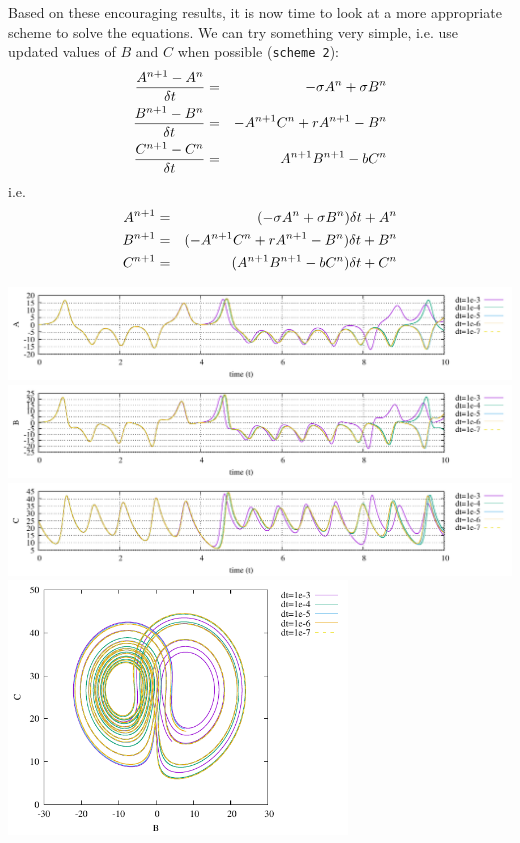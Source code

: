 Based on these encouraging results, it is now time to look at a more appropriate
scheme to solve the equations.
We can try something very simple, i.e. use updated values of $B$ and $C$ when possible ({\tt scheme 2}):
\begin{eqnarray}
\frac{A^{n+1}-A^n}{\delta t} &=& -\sigma A^n + \sigma B^n \nonumber\\
\frac{B^{n+1}-B^n}{\delta t} &=& -A^{n+1} C^n + rA^{n+1} -B^n  \nonumber\\
\frac{C^{n+1}-C^n}{\delta t} &=& A^{n+1} B^{n+1} - bC^n \nonumber
\end{eqnarray}
i.e.
\begin{eqnarray}
A^{n+1} &=& (-\sigma A^n + \sigma B^n) \delta t + A^n \nonumber\\
B^{n+1} &=& (-A^{n+1} C^n + rA^{n+1} -B^n ) \delta t+ B^n \nonumber\\
C^{n+1} &=& (A^{n+1} B^{n+1} - bC^n ) \delta t + C^n \nonumber
\end{eqnarray}

\begin{center}
\includegraphics[width=16cm]{python_codes/fieldstone_156/results/scheme2/A.pdf}
\includegraphics[width=16cm]{python_codes/fieldstone_156/results/scheme2/B.pdf}
\includegraphics[width=16cm]{python_codes/fieldstone_156/results/scheme2/C.pdf}\\
\includegraphics[width=9cm]{python_codes/fieldstone_156/results/scheme2/BC.pdf}\\
\end{center}

